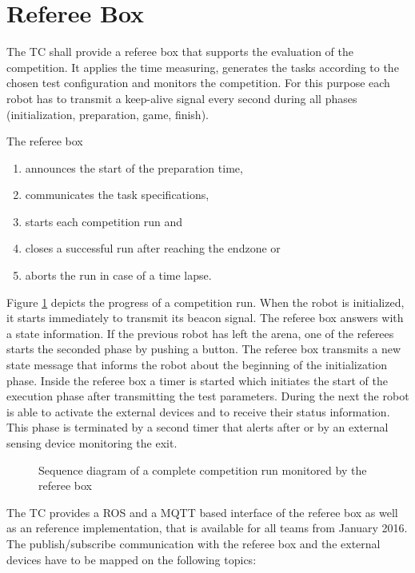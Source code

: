 \section{Referee Box}
The TC shall provide a referee box that supports the evaluation of the competition. It applies the time measuring, generates the tasks according to the chosen test configuration and monitors the
competition. For this purpose each robot has to transmit a keep-alive signal every second during all phases (initialization, preparation, game, finish). 

The referee box
\begin{enumerate}
  \item announces the start of the preparation time,
  \item communicates the task specifications,
  \item starts each competition run and
  \item closes a successful run after reaching the endzone or
  \item aborts the run in case of a time lapse.
\end{enumerate}

Figure \ref{fig:refbox} depicts the progress of a competition run. When the robot is initialized, it starts immediately to transmit its beacon signal. The referee box answers with a state information. If the previous robot has left the arena, one of the referees starts the seconded phase by pushing a button. The referee box transmits a new state message that informs the robot about the beginning of the initialization phase. Inside the referee box a timer is started which initiates the start of the execution phase after transmitting the test parameters. During the next  the robot is able to activate the external devices and to receive their status information. This phase is terminated by a second timer that alerts after  or by an external sensing device monitoring the exit.

\begin{figure}
\centering

\caption{Sequence diagram of a complete competition run monitored by the referee box}
\label{fig:refbox}
\end{figure}
\par
The TC provides a ROS and a MQTT based interface of the referee box as well as an reference implementation, that is available for all teams from January 2016.
The publish/subscribe communication with the referee box and the external devices have to be mapped on the following topics:

